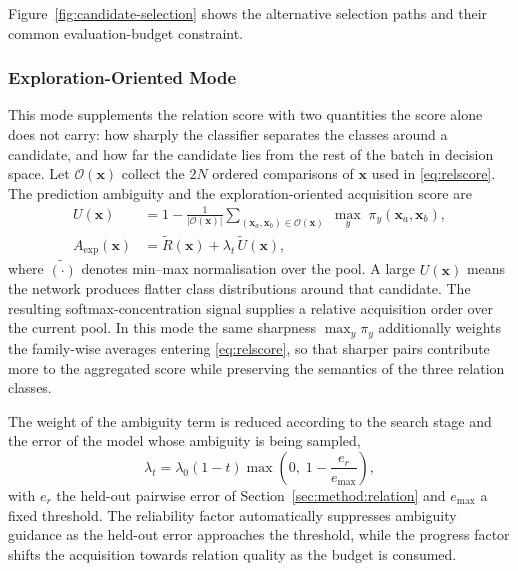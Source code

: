 \documentclass[final,5p,times,twocolumn]{elsarticle}
\newcommand{\vx}{\mathbf{x}}
\begin{document}
Figure~\ref{fig:candidate-selection} shows the alternative selection paths
and their common evaluation-budget constraint.


\subsubsection{Exploration-Oriented Mode}
\label{sec:method:candidate:exp}

This mode supplements the relation score with two quantities the score alone
does not carry: how sharply the classifier separates the classes around a
candidate, and how far the candidate lies from the rest of the batch in
decision space. Let $\mathcal{O}(\vx)$ collect the $2N$ ordered comparisons of
$\vx$ used in \eqref{eq:relscore}. The prediction ambiguity and the
exploration-oriented acquisition score are
\begin{equation}
\begin{aligned}
U(\vx)&=1-\frac{1}{|\mathcal{O}(\vx)|}
\sum_{(\vx_a,\vx_b)\in\mathcal{O}(\vx)}\;
\max_{y}\;\pi_y(\vx_a,\vx_b),\\
A_{\mathrm{exp}}(\vx)&=\widetilde R(\vx)+\lambda_t\,\widetilde U(\vx),
\end{aligned}
\label{eq:expscore}
\end{equation}
where $\widetilde{(\cdot)}$ denotes min--max normalisation over the pool. A
large $U(\vx)$ means the network produces flatter class distributions around
that candidate. The resulting softmax-concentration signal supplies a relative
acquisition order over the current pool. In this mode the same sharpness
$\max_y\pi_y$ additionally weights the family-wise averages entering
\eqref{eq:relscore}, so that sharper pairs contribute more to the aggregated
score while preserving the semantics of the three relation classes.

The weight of the ambiguity term is reduced according to the search stage and
the error of the model whose ambiguity is being sampled,
\begin{equation}
\lambda_t=\lambda_0(1-t)\max\!\left(0,\;1-\frac{e_r}{e_{\max}}\right),
\label{eq:lambda}
\end{equation}
with $e_r$ the held-out pairwise error of
Section~\ref{sec:method:relation} and $e_{\max}$ a fixed threshold. The
reliability factor automatically suppresses ambiguity guidance as the
held-out error approaches the threshold, while the progress factor shifts the
acquisition towards relation quality as the budget is consumed.
\end{document}
